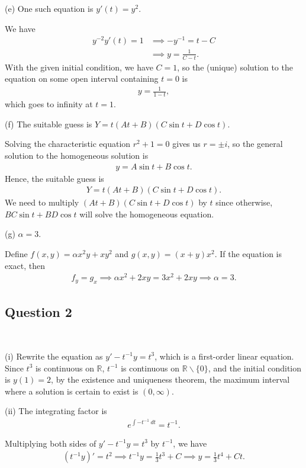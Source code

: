 \documentclass[12pt]{amsart}
\theoremstyle{plain}
\theoremstyle{definition}
\def\mb{\mathbb}
\newcommand{\RA}{\implies}
\begin{document}
(e) One such equation is $y'(t)=y^2$.

We have
\begin{align*}
	y^{-2}y'(t)=1&\RA -y^{-1}=t-C\\
	&\RA y=\frac{1}{C-t}.
\end{align*}
With the given initial condition, we have $C=1$, so the (unique) solution to the equation on some open interval containing $t=0$ is 
\begin{align*}
	y=\frac{1}{1-t},
\end{align*}
which goes to infinity at $t=1$.

(f) The suitable guess is $Y=t(At+B)(C\sin t+D\cos t)$.

Solving the characteristic equation $r^2+1=0$ gives us $r=\pm i$, so the general solution to the homogeneous solution is 
\begin{align*}
	y=A\sin t+B\cos t.
\end{align*}
Hence, the suitable guess is
\begin{align*}
	Y=t(At+B)(C\sin t+D\cos t).
\end{align*}
We need to multiply $(At+B)(C\sin t+D\cos t)$ by $t$ since otherwise, $BC\sin t+BD\cos t$ will solve the homogeneous equation.

(g) $\alpha=3$.

Define $f(x,y)=\alpha x^2y+xy^2$ and $g(x,y)=(x+y)x^2$. If the equation is exact, then 
\begin{align*}
	f_y=g_x\RA \alpha x^2+2xy=3x^2+2xy\RA \alpha=3.
\end{align*}

\subsection*{Question 2} \ 

(i) Rewrite the equation as $\displaystyle y'-t^{-1}y =t^3$, which is a first-order linear equation. Since $t^3$ is continuous on $\mb R$, $t^{-1}$ is continuous on $\mb R\backslash\{0\}$, and the initial condition is $y(1)=2$, by the existence and uniqueness theorem, the maximum interval where a solution is certain to exist is $(0,\infty)$.

(ii) The integrating factor is 
\begin{align*}
	e^{\int -t^{-1}\ dt}=t^{-1}.
\end{align*}

Multiplying both sides of $\displaystyle y'-t^{-1}y =t^3$ by $t^{-1}$, we have
\begin{align*}
	\left(t^{-1} y\right)'=t^2\RA t^{-1}y=\frac13t^3+C\RA y=\frac13t^4+Ct.
\end{align*}
\end{document}
